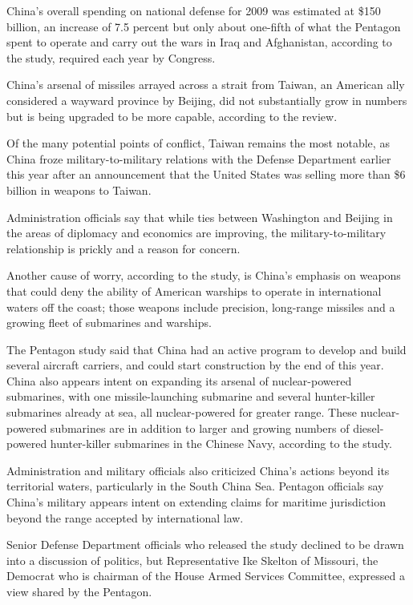 ﻿\documentclass[12pt]{article}
\begin{document}
China's overall spending on national defense for 2009 was estimated at \$150 billion, an increase of
7.5 percent but only about one-fifth of what the Pentagon spent to operate and carry out the wars in
Iraq and Afghanistan, according to the study, required each year by Congress.

China's arsenal of missiles arrayed across a strait from Taiwan, an American ally considered a
wayward province by Beijing, did not substantially grow in numbers but is being upgraded to be more
capable, according to the review.

Of the many potential points of conflict, Taiwan remains the most notable, as China froze
military-to-military relations with the Defense Department earlier this year after an announcement
that the United States was selling more than \$6 billion in weapons to Taiwan.

Administration officials say that while ties between Washington and Beijing in the areas of
diplomacy and economics are improving, the military-to-military relationship is prickly and a reason
for concern.

Another cause of worry, according to the study, is China's emphasis on weapons that could deny the
ability of American warships to operate in international waters off the coast; those weapons include
precision, long-range missiles and a growing fleet of submarines and warships.

The Pentagon study said that China had an active program to develop and build several aircraft
carriers, and could start construction by the end of this year. China also appears intent on
expanding its arsenal of nuclear-powered submarines, with one missile-launching submarine and
several hunter-killer submarines already at sea, all nuclear-powered for greater range. These
nuclear-powered submarines are in addition to larger and growing numbers of diesel-powered
hunter-killer submarines in the Chinese Navy, according to the study.

Administration and military officials also criticized China's actions beyond its territorial waters,
particularly in the South China Sea. Pentagon officials say China's military appears intent on
extending claims for maritime jurisdiction beyond the range accepted by international law.

Senior Defense Department officials who released the study declined to be drawn into a discussion of
politics, but Representative Ike Skelton of Missouri, the Democrat who is chairman of the House
Armed Services Committee, expressed a view shared by the Pentagon.
\end{document}
